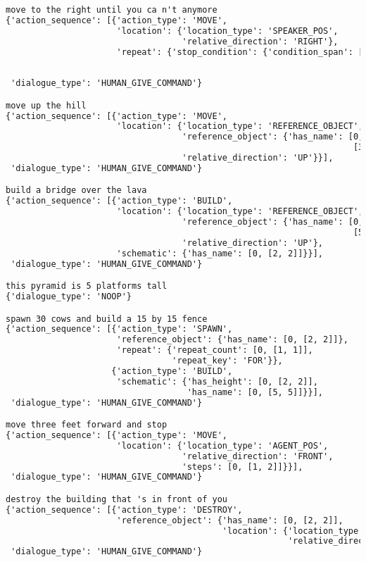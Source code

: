 \begin{lstlisting}[language=TeX]
move to the right until you ca n't anymore
{'action_sequence': [{'action_type': 'MOVE',
                      'location': {'location_type': 'SPEAKER_POS',
                                   'relative_direction': 'RIGHT'},
                      'repeat': {'stop_condition': {'condition_span': [0,
                                                                       [4,
                                                                        8]]}}}],
 'dialogue_type': 'HUMAN_GIVE_COMMAND'}

move up the hill
{'action_sequence': [{'action_type': 'MOVE',
                      'location': {'location_type': 'REFERENCE_OBJECT',
                                   'reference_object': {'has_name': [0,
                                                                     [3, 3]]},
                                   'relative_direction': 'UP'}}],
 'dialogue_type': 'HUMAN_GIVE_COMMAND'}

build a bridge over the lava
{'action_sequence': [{'action_type': 'BUILD',
                      'location': {'location_type': 'REFERENCE_OBJECT',
                                   'reference_object': {'has_name': [0,
                                                                     [5, 5]]},
                                   'relative_direction': 'UP'},
                      'schematic': {'has_name': [0, [2, 2]]}}],
 'dialogue_type': 'HUMAN_GIVE_COMMAND'}

this pyramid is 5 platforms tall
{'dialogue_type': 'NOOP'}

spawn 30 cows and build a 15 by 15 fence
{'action_sequence': [{'action_type': 'SPAWN',
                      'reference_object': {'has_name': [0, [2, 2]]},
                      'repeat': {'repeat_count': [0, [1, 1]],
                                 'repeat_key': 'FOR'}},
                     {'action_type': 'BUILD',
                      'schematic': {'has_height': [0, [2, 2]],
                                    'has_name': [0, [5, 5]]}}],
 'dialogue_type': 'HUMAN_GIVE_COMMAND'}

move three feet forward and stop
{'action_sequence': [{'action_type': 'MOVE',
                      'location': {'location_type': 'AGENT_POS',
                                   'relative_direction': 'FRONT',
                                   'steps': [0, [1, 2]]}}],
 'dialogue_type': 'HUMAN_GIVE_COMMAND'}

destroy the building that 's in front of you
{'action_sequence': [{'action_type': 'DESTROY',
                      'reference_object': {'has_name': [0, [2, 2]],
                                           'location': {'location_type': 'AGENT_POS',
                                                        'relative_direction': 'FRONT'}}}],
 'dialogue_type': 'HUMAN_GIVE_COMMAND'}


\end{lstlisting}
